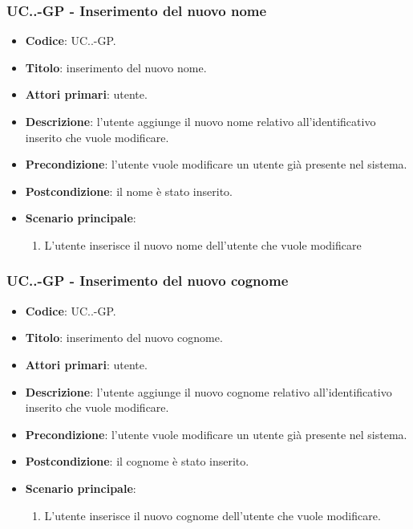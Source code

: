 			\subsubsection{UC\theuccount.\thesubuccount.\thesubsubuccount-GP - Inserimento del nuovo nome}
				
				\begin{itemize}
					\item \textbf{Codice}: UC\theuccount.\thesubuccount.\thesubsubuccount-GP.
					\item \textbf{Titolo}: inserimento del nuovo nome.
					\item \textbf{Attori primari}: utente.
					\item \textbf{Descrizione}: l'utente aggiunge il nuovo nome relativo all'identificativo inserito che vuole modificare.
					\item \textbf{Precondizione}: l'utente vuole modificare un utente già presente nel sistema.
					\item \textbf{Postcondizione}: il nome è stato inserito.
					\item \textbf{Scenario principale}:
					\begin{enumerate}
						\item L'utente inserisce il nuovo nome dell'utente che vuole modificare
					\end{enumerate}
				\end{itemize}
			
			\subsubsection{UC\theuccount.\thesubuccount.\thesubsubuccount-GP - Inserimento del nuovo cognome}
				
				\begin{itemize}
					\item \textbf{Codice}: UC\theuccount.\thesubuccount.\thesubsubuccount-GP.
					\item \textbf{Titolo}: inserimento del nuovo cognome.
					\item \textbf{Attori primari}: utente.
					\item \textbf{Descrizione}: l'utente aggiunge il nuovo cognome relativo all'identificativo inserito che vuole modificare.
					\item \textbf{Precondizione}: l'utente vuole modificare un utente già presente nel sistema.
					\item \textbf{Postcondizione}: il cognome è stato inserito.
					\item \textbf{Scenario principale}:
					\begin{enumerate}
						\item L'utente inserisce il nuovo cognome dell'utente che vuole modificare.
					\end{enumerate}
				\end{itemize}
			
